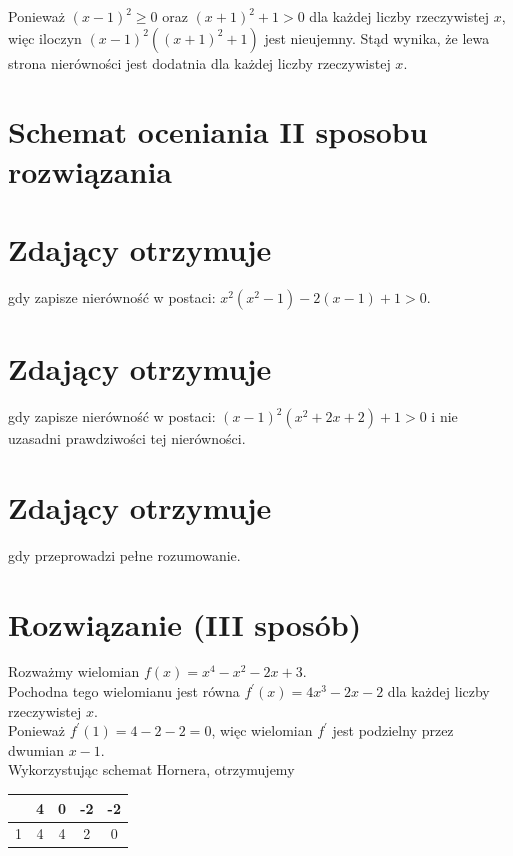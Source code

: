 \documentclass[10pt]{article}
\begin{document}
Ponieważ $(x-1)^{2} \geq 0$ oraz $(x+1)^{2}+1>0$ dla każdej liczby rzeczywistej $x$, więc iloczyn $(x-1)^{2}\left((x+1)^{2}+1\right)$ jest nieujemny. Stąd wynika, że lewa strona nierówności jest dodatnia dla każdej liczby rzeczywistej $x$.

\section*{Schemat oceniania II sposobu rozwiązania}
\section*{Zdający otrzymuje}
gdy zapisze nierówność w postaci: $x^{2}\left(x^{2}-1\right)-2(x-1)+1>0$.

\section*{Zdający otrzymuje}
gdy zapisze nierówność w postaci: $(x-1)^{2}\left(x^{2}+2 x+2\right)+1>0$ i nie uzasadni prawdziwości tej nierówności.

\section*{Zdający otrzymuje}
gdy przeprowadzi pełne rozumowanie.

\section*{Rozwiązanie (III sposób)}
Rozważmy wielomian $f(x)=x^{4}-x^{2}-2 x+3$.\\
Pochodna tego wielomianu jest równa $f^{\prime}(x)=4 x^{3}-2 x-2$ dla każdej liczby rzeczywistej $x$.\\
Ponieważ $f^{\prime}(1)=4-2-2=0$, więc wielomian $f^{\prime}$ jest podzielny przez dwumian $x-1$.\\
Wykorzystując schemat Hornera, otrzymujemy

\begin{center}
\begin{tabular}{|c|c|c|c|c|}
\hline
 & 4 & 0 & -2 & -2 \\
\hline
1 & 4 & 4 & 2 & 0 \\
\hline
\end{tabular}
\end{center}
\end{document}
